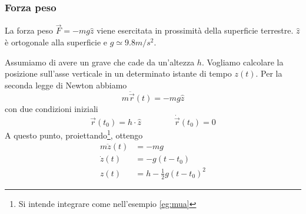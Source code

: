 \subsubsection{Forza peso}
La forza peso $\vec{F}=-mg\widehat{z}$ viene esercitata in prossimità della superficie terrestre. $\widehat{z}$ è ortogonale alla superficie e $g \simeq 9.8 m/s^2$.
\begin{example}
	Assumiamo di avere un grave che cade da un'altezza $h$. Vogliamo calcolare la posizione sull'asse verticale in un determinato istante di tempo $z(t)$. Per la seconda legge di Newton abbiamo
	\begin{equation*}
		m \ddot{\vec{r}}(t) = -mg\widehat{z}
	\end{equation*}
	con due condizioni iniziali
	\begin{equation*}
		\vec{r}(t_0) = h \cdot \widehat{z} \qquad\qquad \dot{\vec{r}}(t_0) = 0
	\end{equation*}
	A questo punto, proiettando\footnote{Si intende integrare come nell'esempio \ref{eg:mua}}, ottengo
	\begin{align*}
		m \ddot{z}(t) & = -mg \\
		\dot{z}(t) & = -g(t-t_0) \\
		z(t) & = h - \frac{1}{2} g (t- t_0)^2
	\end{align*}
\end{example}


